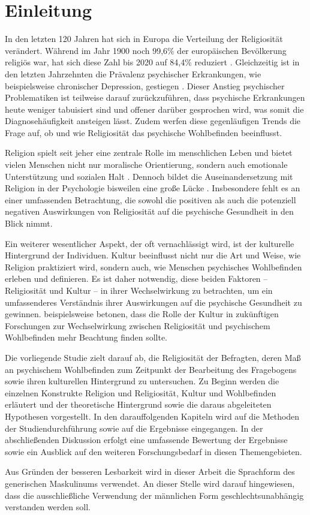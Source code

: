 \chapter{Einleitung}   \label{ch_1}
In den letzten 120 Jahren hat sich in Europa die %
Verteilung der Religiosität verändert. Während im Jahr 1900 noch 99,6\% der europäischen Bevölkerung religiös war, hat sich diese Zahl bis 2020 auf 84,4\% reduziert \parencite{Zurlo2021}. Gleichzeitig ist in den letzten Jahrzehnten die Prävalenz psychischer Erkrankungen, wie beispielsweise chronischer Depression, gestiegen \parencite{EU2021}. Dieser Anstieg psychischer Problematiken ist teilweise darauf zurückzuführen, dass psychische Erkrankungen heute weniger tabuisiert sind und offener darüber gesprochen wird, was somit die Diagnosehäufigkeit ansteigen lässt. Zudem werfen diese gegenläufigen Trends die Frage auf, ob und wie Religiosität das psychische Wohlbefinden beeinflusst.

Religion spielt seit jeher eine zentrale Rolle im menschlichen Leben und bietet vielen Menschen nicht nur moralische Orientierung, sondern auch emotionale Unterstützung und sozialen Halt \parencite{Hemel2023, Jakobs_2018}. Dennoch bildet die Auseinandersetzung mit Religion in der Psychologie bisweilen eine große Lücke \parencite{ReliInKultur}. Insbesondere fehlt es an einer umfassenden Betrachtung, die sowohl die positiven als auch die potenziell negativen Auswirkungen von Religiosität auf die psychische Gesundheit in den Blick nimmt.

Ein weiterer wesentlicher Aspekt, der oft vernachlässigt wird, ist der kulturelle Hintergrund der Individuen. Kultur beeinflusst nicht nur die Art und Weise, wie Religion praktiziert wird, sondern auch, wie Menschen psychisches Wohlbefinden erleben und definieren. Es ist daher notwendig, diese beiden Faktoren – Religiosität und Kultur – in ihrer Wechselwirkung zu betrachten, um ein umfassenderes Verständnis ihrer Auswirkungen auf die psychische Gesundheit zu gewinnen. \textcite{HardyNelsonMooreKing2019} beispielsweise betonen, dass die Rolle der Kultur in zukünftigen Forschungen zur Wechselwirkung zwischen Religiosität und psychischem Wohlbefinden mehr Beachtung finden sollte.

Die vorliegende Studie zielt darauf ab, die Religiosität der Befragten, deren Maß an psychischem Wohlbefinden zum Zeitpunkt der Bearbeitung des Fragebogens sowie ihren kulturellen Hintergrund zu untersuchen. Zu Beginn werden die einzelnen Konstrukte Religion und Religiosität, Kultur und Wohlbefinden erläutert und der theoretische Hintergrund sowie die daraus abgeleiteten Hypothesen vorgestellt. In den darauffolgenden Kapiteln wird auf die Methoden der Studiendurchführung sowie auf die Ergebnisse eingegangen. In der abschließenden Diskussion erfolgt eine umfassende Bewertung der Ergebnisse sowie ein Ausblick auf den weiteren Forschungsbedarf in diesen Themengebieten.

Aus Gründen der besseren Lesbarkeit wird in dieser Arbeit die Sprachform des generischen Maskulinums verwendet. An dieser Stelle wird darauf hingewiesen, dass die ausschließliche Verwendung der männlichen Form geschlechtsunabhängig verstanden
werden soll.


